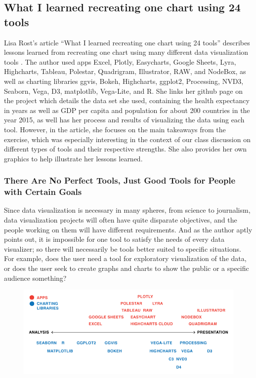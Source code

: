 \documentclass[]{book}
\theoremstyle{definition}
\theoremstyle{definition}
\theoremstyle{definition}
\theoremstyle{remark}
\begin{document}
\subsection{What I learned recreating one chart using 24
tools}\label{what-i-learned-recreating-one-chart-using-24-tools}

Lisa Rost's article ``What I learned recreating one chart using 24
tools'' describes lessons learned from recreating one chart using many
different data visualization tools \citep{different_tools}. The author
used apps Excel, Plotly, Easycharts, Google Sheets, Lyra, Highcharts,
Tableau, Polestar, Quadrigram, Illustrator, RAW, and NodeBox, as well as
charting libraries ggvis, Bokeh, Highcharts, ggplot2, Processing, NVD3,
Seaborn, Vega, D3, matplotlib, Vega-Lite, and R. She links her github
page on the project which details the data set she used, containing the
health expectancy in years as well as GDP per capita and population for
about 200 countries in the year 2015, as well has her process and
results of visualizing the data using each tool. However, in the
article, she focuses on the main takeaways from the exercise, which was
especially interesting in the context of our class discussion on
different types of tools and their respective strengths. She also
provides her own graphics to help illustrate her lessons learned.

\subsubsection{There Are No Perfect Tools, Just Good Tools for People
with Certain
Goals}\label{there-are-no-perfect-tools-just-good-tools-for-people-with-certain-goals}

Since data visualization is necessary in many spheres, from science to
journalism, data visualization projects will often have quite disparate
objectives, and the people working on them will have different
requirements. And as the author aptly points out, it is impossible for
one tool to satisfy the needs of every data visualizer; so there will
necessarily be tools better suited to specific situations. For example,
does the user need a tool for exploratory visualization of the data, or
does the user seek to create graphs and charts to show the public or a
specific audience something?

\begin{figure}
\centering
\includegraphics{images/analysis_spectrum.png}
\caption{}
\end{figure}
\end{document}
